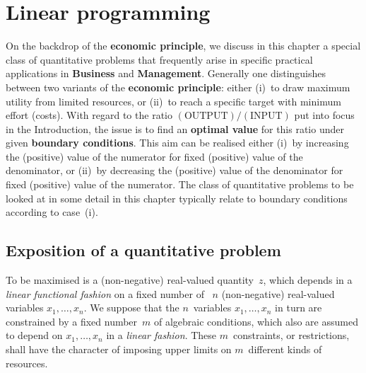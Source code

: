 \chapter[Linear programming]{Linear programming}

\vspace{10mm}
\noindent
On the backdrop of the {\bf economic principle}, we discuss in 
this chapter a special class of quantitative problems that 
frequently arise in specific practical applications in {\bf 
Business} and {\bf Management}. Generally one distinguishes 
between two variants of the {\bf economic principle}: either 
(i)~to draw maximum utility from limited resources, or (ii)~to 
reach a specific target with minimum effort (costs). With regard 
to the ratio $(\text{OUTPUT})/(\text{INPUT})$ put into focus in 
the Introduction, the issue is to find an {\bf optimal value} for 
this ratio under given {\bf boundary conditions}. This aim can be 
realised either (i)~by increasing the (positive) value of the 
numerator for fixed (positive) value of the denominator, or 
(ii)~by decreasing the (positive) value of the denominator for 
fixed (positive) value of the numerator. The class of quantitative 
problems to be looked at in some detail in this chapter typically 
relate to boundary conditions according to case~(i).

\section[Exposition of a quantitative problem]{Exposition of a
quantitative problem}
To be maximised is a (non-negative) real-valued quantity~$z$, 
which depends in a \emph{linear functional fashion} on a fixed 
number of ~$n$ (non-negative) real-valued variables $x_{1}, 
\ldots, x_{n}$. We suppose that the $n$~variables $x_{1}, \ldots, 
x_{n}$ in turn are constrained by a fixed number~$m$ of algebraic 
conditions, which also are assumed to depend on $x_{1}, \ldots, 
x_{n}$ in a \emph{linear fashion}. These $m$~constraints, or 
restrictions, shall have the character of imposing upper limits on 
$m$~different kinds of resources.

